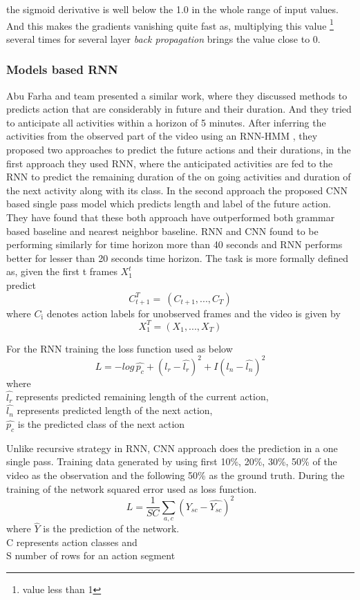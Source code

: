 the sigmoid derivative is well below the 1.0 in the whole range of input values. And this makes the gradients vanishing quite fast as, multiplying this value \footnote{value less than 1} several times for several layer \textit{ back propagation} brings the value close to 0.

\subsubsection{Models based RNN }
\newpara Abu Farha and team presented \cite{abu2018will} a similar work, where they discussed methods to predicts action that are considerably in future and their duration. And they tried to anticipate all activities within a horizon of 5 minutes. After inferring the activities from the observed part of the video using an RNN-HMM \cite{richard2017weakly}, they proposed two approaches to predict the future actions and their durations, in the first approach they used RNN, where the anticipated activities are fed to the RNN to predict the remaining duration of the on going activities and duration of the next activity along with its class.
In the second approach the proposed CNN based single pass model which predicts length and label of the future action. They have found that these both approach have outperformed both grammar based baseline and nearest neighbor baseline. RNN and CNN found to be performing similarly for time horizon more than 40 seconds and RNN performs better for lesser than 20 seconds time horizon. The task is more formally defined as,
given the first t frames $X_{\text{1}}^t$ \\
predict \[ C_{t+1}^T  = \ (C_{t+1}, ..., C_{T}) \]
where $C_{\text{i}}$ denotes action labels for unobserved frames
and the video is given by
\[ X_{1}^T = (X_{1}, ..., X_{T}) \]

\newpara
For the RNN training the loss function used as below
\begin{equation}
    L = -log\, \hat{p_c} + (l_r - \hat{l_r})^2 +  I (l_n - \hat{l_n})^2 
\end{equation}
where \\
$\hat{l_r}$ represents predicted remaining length of the current action, \\
$\hat{l_n}$ represents predicted length of the next action, \\
$\hat{p_c}$ is the predicted class of the next action

\newpara Unlike recursive strategy in RNN, CNN approach does the prediction in a one single pass.
Training data generated by using first 10\%, 20\%, 30\%, 50\% of the video as the observation and the following 50\% as the ground truth. During the training of the network squared error used as loss function.
\begin{equation}
    L = \frac{1} {SC} \sum_{a,c} (Y_{sc} - \hat{Y_{sc}})^2 
\end{equation}
where $\hat{Y}$ is the prediction of the network. \\
C represents action classes and \\
S number of rows for an action segment

